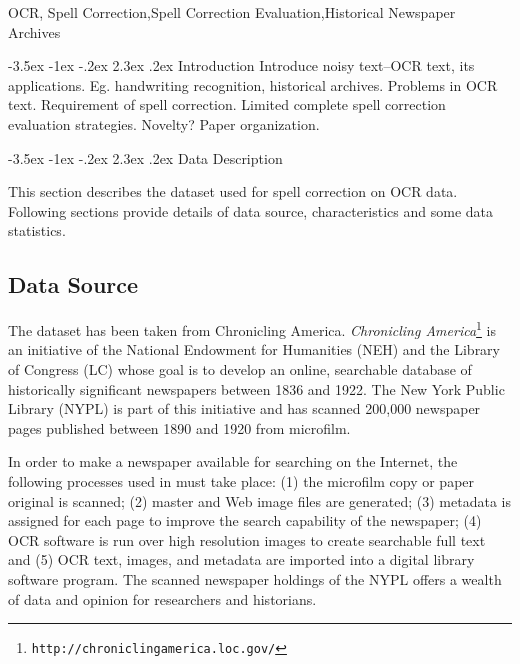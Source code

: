 \documentclass[12pt]{article}
\makeatletter
\renewcommand\section{\@startsection{section}{1}{\z@}%
                                  {-3.5ex \@plus -1ex \@minus -.2ex}%
                                  {2.3ex \@plus.2ex}%
                                  {\normalfont\bfseries}}
\makeatother
\begin{document}
 OCR, Spell Correction,Spell Correction Evaluation,Historical Newspaper Archives

\section{Introduction}
Introduce noisy text--OCR text, its applications. Eg. handwriting recognition, historical archives.
Problems in OCR text. Requirement of spell correction. Limited complete spell correction evaluation strategies. Novelty?
Paper organization.

\section{Data Description}
\label{chapter:data description}

This section describes the dataset used for spell correction on OCR data. Following sections provide details of data source, characteristics and some data statistics.

\subsection{Data Source} 

The dataset has been taken from Chronicling America.
\noindent \emph{Chronicling
America}\footnote{\texttt{http://chroniclingamerica.loc.gov/}} is an
initiative of the National Endowment for Humanities (NEH) and the
Library of Congress (LC) whose goal is to develop an online,
searchable database of historically significant newspapers between
1836 and 1922. The New York Public Library (NYPL) is part of this
initiative and has scanned 200,000 newspaper pages published between
1890 and 1920 from microfilm.

In order to make a newspaper available for searching on the Internet,
the following processes used in \cite{dutta2011learning} must take place: (1) the microfilm copy or
paper original is scanned; (2) master and Web image files are
generated; (3) metadata is assigned for each page to improve the
search capability of the newspaper; (4) OCR software is run over high
resolution images to create searchable full text and (5) OCR text,
images, and metadata are imported into a digital library software
program. The scanned newspaper holdings of the NYPL offers a wealth of
data and opinion for researchers and historians.
\end{document}
